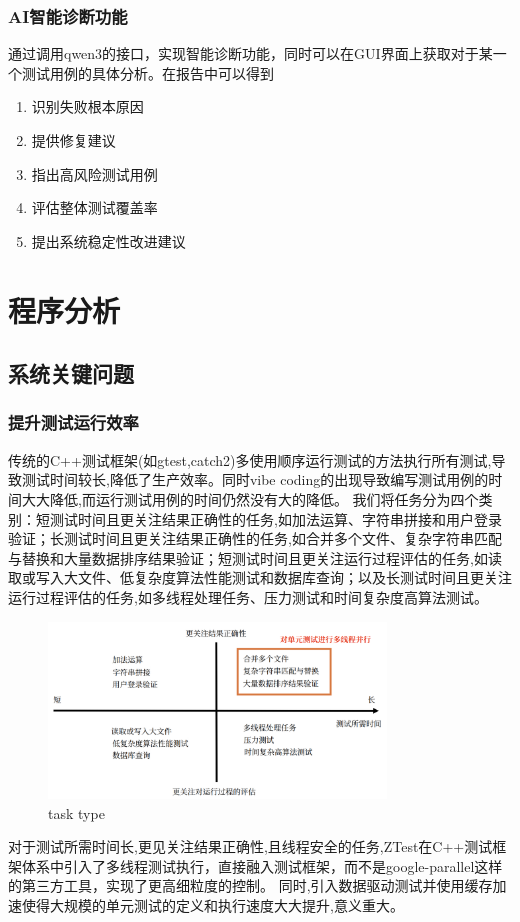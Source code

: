 \documentclass{article}
\begin{document}
\subsubsection{AI智能诊断功能}
通过调用qwen3的接口，实现智能诊断功能，同时可以在GUI界面上获取对于某一个测试用例的具体分析。在报告中可以得到
\begin{enumerate}
    \item 识别失败根本原因
    \item 提供修复建议
    \item 指出高风险测试用例
    \item 评估整体测试覆盖率
    \item 提出系统稳定性改进建议
\end{enumerate}
\newpage
\section{程序分析}
\subsection{ 系统关键问题}
\subsubsection{提升测试运行效率}
传统的C++测试框架(如gtest,catch2)多使用顺序运行测试的方法执行所有测试,导致测试时间较长,降低了生产效率。同时vibe coding的出现导致编写测试用例的时间大大降低,而运行测试用例的时间仍然没有大的降低。
我们将任务分为四个类别：短测试时间且更关注结果正确性的任务,如加法运算、字符串拼接和用户登录验证；长测试时间且更关注结果正确性的任务,如合并多个文件、复杂字符串匹配与替换和大量数据排序结果验证；短测试时间且更关注运行过程评估的任务,如读取或写入大文件、低复杂度算法性能测试和数据库查询；以及长测试时间且更关注运行过程评估的任务,如多线程处理任务、压力测试和时间复杂度高算法测试。
\begin{figure}[H]
    \centering
    \includegraphics[width=0.8\textwidth]{img/task.png} %
    \caption{ task type}
    \label{fig:task types }
\end{figure}
对于测试所需时间长,更见关注结果正确性,且线程安全的任务,ZTest在C++测试框架体系中引入了多线程测试执行，直接融入测试框架，而不是google-parallel这样的第三方工具，实现了更高细粒度的控制。
同时,引入数据驱动测试并使用缓存加速使得大规模的单元测试的定义和执行速度大大提升,意义重大。
\end{document}
